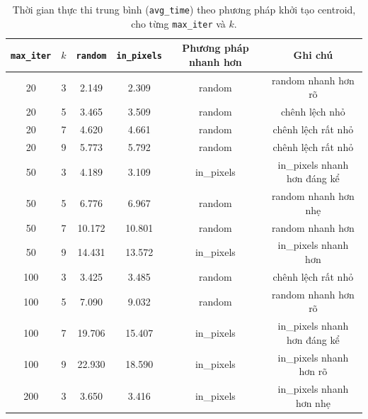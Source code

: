 \begin{table}[H]
  \centering
  \caption{Thời gian thực thi trung bình (\texttt{avg\_time}) theo phương pháp khởi tạo centroid, cho từng \texttt{max\_iter} và \(k\).}
  \begin{tabular}{|c|c|c|c|c|c|}
    \toprule
    \texttt{max\_iter} & \(k\) & \texttt{random} & \texttt{in\_pixels} & Phương pháp nhanh hơn & Ghi chú                      \\
    \midrule
    20                 & 3     & 2.149           & 2.309               & random                & random nhanh hơn rõ          \\
    20                 & 5     & 3.465           & 3.509               & random                & chênh lệch nhỏ               \\
    20                 & 7     & 4.620           & 4.661               & random                & chênh lệch rất nhỏ           \\
    20                 & 9     & 5.773           & 5.792               & random                & chênh lệch rất nhỏ           \\
    \midrule
    50                 & 3     & 4.189           & 3.109               & in\_pixels            & in\_pixels nhanh hơn đáng kể \\
    50                 & 5     & 6.776           & 6.967               & random                & random nhanh hơn nhẹ         \\
    50                 & 7     & 10.172          & 10.801              & random                & random nhanh hơn             \\
    50                 & 9     & 14.431          & 13.572              & in\_pixels            & in\_pixels nhanh hơn         \\
    \midrule
    100                & 3     & 3.425           & 3.485               & random                & chênh lệch rất nhỏ           \\
    100                & 5     & 7.090           & 9.032               & random                & random nhanh hơn rõ          \\
    100                & 7     & 19.706          & 15.407              & in\_pixels            & in\_pixels nhanh hơn đáng kể \\
    100                & 9     & 22.930          & 18.590              & in\_pixels            & in\_pixels nhanh hơn rõ      \\
    \midrule
    200                & 3     & 3.650           & 3.416               & in\_pixels            & in\_pixels nhanh hơn nhẹ     \\

\end{tabular}
\end{table}
